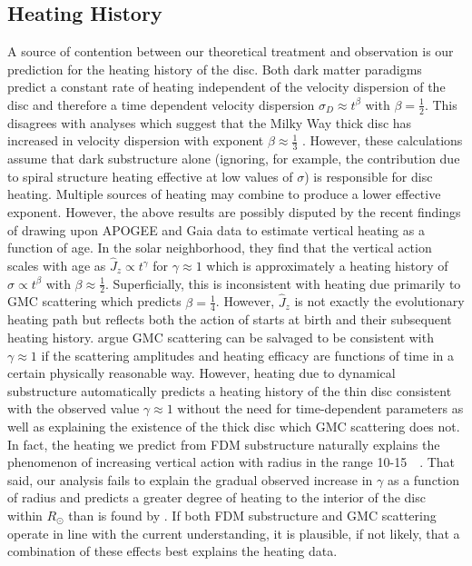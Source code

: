 \documentclass[usenatbib]{mnras}
\begin{document}
\subsection{Heating History}

A source of contention between our theoretical treatment and observation is our prediction for the heating history of the disc. Both dark matter paradigms predict a constant rate of heating independent of the velocity dispersion of the disc and therefore a time dependent velocity dispersion $\sigma_D \approx t^{\beta}$ with $\beta = \tfrac{1}{2}$. This disagrees with analyses which suggest that the Milky Way thick disc has increased in velocity dispersion with exponent $\beta \approx \tfrac{1}{3}$ \citep{heating_history}. However, these calculations assume that dark substructure alone (ignoring, for example, the contribution due to spiral structure heating effective at low values of $\sigma$) is responsible for disc heating. Multiple sources of heating may combine to produce a lower effective exponent. However, the above results are possibly disputed by the recent findings of \cite{Gaia_vertical_motions} drawing upon APOGEE and Gaia data to estimate vertical heating as a function of age. In the solar neighborhood, they find that the vertical action scales with age as $\widehat{J}_z \propto t^{\gamma}$ for $\gamma \approx 1$ which is approximately a heating history of $\sigma \propto t^\beta$ with $\beta \approx \frac{1}{2}$. Superficially, this is inconsistent with heating due primarily to GMC scattering which predicts $\beta = \frac{1}{4}$. However, $\widehat{J}_z$ is not exactly the evolutionary heating path but reflects both the action of starts at birth and their subsequent heating history. \cite{Gaia_vertical_motions} argue GMC scattering can be salvaged to be consistent with $\gamma \approx 1$ if the scattering amplitudes and heating efficacy are functions of time in a certain physically reasonable way. However, heating due to dynamical substructure automatically predicts a heating history of the thin disc consistent with the observed value $\gamma \approx 1$ without the need for time-dependent parameters as well as explaining the existence of the thick disc which GMC scattering does not. In fact, the heating we predict from FDM substructure naturally explains the phenomenon of increasing vertical action with radius in the range 10-\SI{15}{\kilo \parsec}. 
That said, our analysis fails to explain the gradual observed increase in $\gamma$ as a function of radius and predicts a greater degree of heating to the interior of the disc within $R_{\odot}$ than is found by \cite{Gaia_vertical_motions}. If both FDM substructure and GMC scattering operate in line with the current understanding, it is plausible, if not likely, that a combination of these effects best explains the heating data. 
\end{document}
